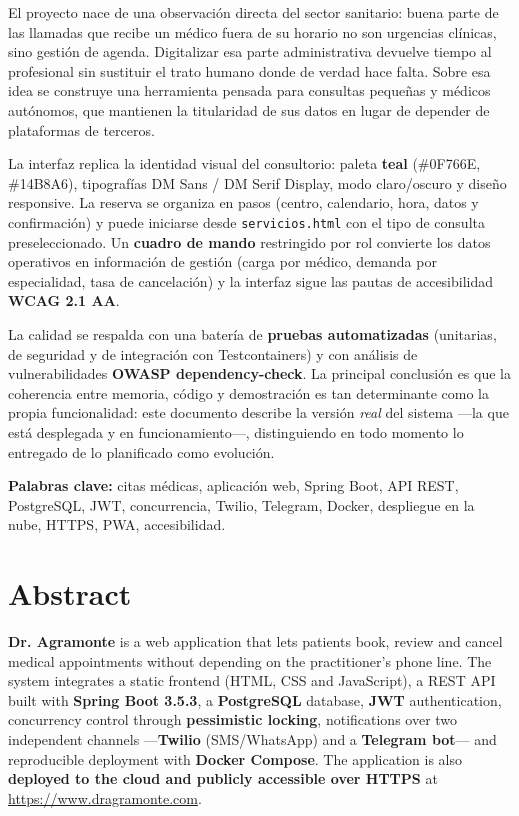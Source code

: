 \documentclass[12pt,a4paper]{report}
\begin{document}
El proyecto nace de una observación directa del sector sanitario: buena parte de las llamadas que recibe un médico fuera de su horario no son urgencias clínicas, sino gestión de agenda. Digitalizar esa parte administrativa devuelve tiempo al profesional sin sustituir el trato humano donde de verdad hace falta. Sobre esa idea se construye una herramienta pensada para consultas pequeñas y médicos autónomos, que mantienen la titularidad de sus datos en lugar de depender de plataformas de terceros.

La interfaz replica la identidad visual del consultorio: paleta \textbf{teal} (\#0F766E, \#14B8A6), tipografías DM Sans / DM Serif Display, modo claro/oscuro y diseño responsive. La reserva se organiza en pasos (centro, calendario, hora, datos y confirmación) y puede iniciarse desde \texttt{servicios.html} con el tipo de consulta preseleccionado. Un \textbf{cuadro de mando} restringido por rol convierte los datos operativos en información de gestión (carga por médico, demanda por especialidad, tasa de cancelación) y la interfaz sigue las pautas de accesibilidad \textbf{WCAG 2.1 AA}.

La calidad se respalda con una batería de \textbf{pruebas automatizadas} (unitarias, de seguridad y de integración con Testcontainers) y con análisis de vulnerabilidades \textbf{OWASP dependency-check}. La principal conclusión es que la coherencia entre memoria, código y demostración es tan determinante como la propia funcionalidad: este documento describe la versión \emph{real} del sistema —la que está desplegada y en funcionamiento—, distinguiendo en todo momento lo entregado de lo planificado como evolución.

\vspace{0.5em}
\noindent\textbf{Palabras clave:} citas médicas, aplicación web, Spring Boot, API REST, PostgreSQL, JWT, concurrencia, Twilio, Telegram, Docker, despliegue en la nube, HTTPS, PWA, accesibilidad.

\chapter*{Abstract}

\textbf{Dr. Agramonte} is a web application that lets patients book, review and cancel medical appointments without depending on the practitioner's phone line. The system integrates a static frontend (HTML, CSS and JavaScript), a REST API built with \textbf{Spring Boot 3.5.3}, a \textbf{PostgreSQL} database, \textbf{JWT} authentication, concurrency control through \textbf{pessimistic locking}, notifications over two independent channels —\textbf{Twilio} (SMS/WhatsApp) and a \textbf{Telegram bot}— and reproducible deployment with \textbf{Docker Compose}. The application is also \textbf{deployed to the cloud and publicly accessible over HTTPS} at \url{https://www.dragramonte.com}.
\end{document}
